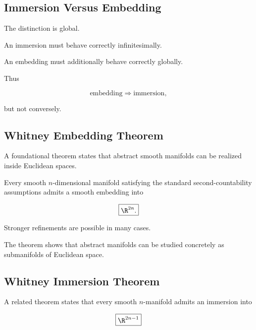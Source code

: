 \subsection{Immersion Versus Embedding}
\label{subsec:immersion-vs-embedding}

The distinction is global.

An immersion must behave correctly infinitesimally.

An embedding must additionally behave correctly globally.

Thus

\[
\boxed{
\text{embedding}
\Longrightarrow
\text{immersion},
}
\]

but not conversely.

\subsection{Whitney Embedding Theorem}
\label{subsec:whitney-embedding}

A foundational theorem states that abstract smooth manifolds can be realized
inside Euclidean spaces.

\begin{theorem}
Every smooth \(n\)-dimensional manifold satisfying the standard
second-countability assumptions admits a smooth embedding into

\[
\boxed{
\R^{2n}.
}
\]
\end{theorem}

Stronger refinements are possible in many cases.

The theorem shows that abstract manifolds can be studied concretely as
submanifolds of Euclidean space.

\subsection{Whitney Immersion Theorem}
\label{subsec:whitney-immersion}

A related theorem states that every smooth \(n\)-manifold admits an
immersion into

\[
\boxed{
\R^{2n-1}
}
\]

